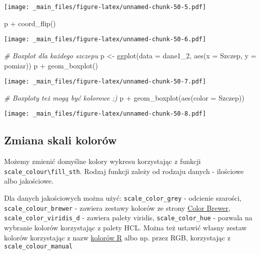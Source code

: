 \documentclass[
]{book}
\newenvironment{Shaded}{\begin{snugshade}}{\end{snugshade}}
\newcommand{\AttributeTok}[1]{\textcolor[rgb]{0.77,0.63,0.00}{#1}}
\newcommand{\CommentTok}[1]{\textcolor[rgb]{0.56,0.35,0.01}{\textit{#1}}}
\newcommand{\FunctionTok}[1]{\textcolor[rgb]{0.00,0.00,0.00}{#1}}
\newcommand{\NormalTok}[1]{#1}
\newcommand{\OtherTok}[1]{\textcolor[rgb]{0.56,0.35,0.01}{#1}}
\newcommand{\SpecialCharTok}[1]{\textcolor[rgb]{0.00,0.00,0.00}{#1}}
\begin{document}
\texttt{[image: \_main\_files/figure-latex/unnamed-chunk-50-5.pdf]}

\begin{Shaded}
\begin{Highlighting}[]
\NormalTok{p }\SpecialCharTok{+} \FunctionTok{coord\_flip}\NormalTok{()}
\end{Highlighting}
\end{Shaded}

\texttt{[image: \_main\_files/figure-latex/unnamed-chunk-50-6.pdf]}

\begin{Shaded}
\begin{Highlighting}[]
\CommentTok{\# Boxplot dla każdego szczepu}
\NormalTok{p }\OtherTok{\textless{}{-}} \FunctionTok{ggplot}\NormalTok{(}\AttributeTok{data =}\NormalTok{ dane1\_2, }\FunctionTok{aes}\NormalTok{(}\AttributeTok{x =}\NormalTok{ Szczep, }\AttributeTok{y =}\NormalTok{ pomiar))}
\NormalTok{p }\SpecialCharTok{+} \FunctionTok{geom\_boxplot}\NormalTok{()}
\end{Highlighting}
\end{Shaded}

\texttt{[image: \_main\_files/figure-latex/unnamed-chunk-50-7.pdf]}

\begin{Shaded}
\begin{Highlighting}[]
\CommentTok{\# Boxploty też mogą być kolorowe ;)}
\NormalTok{p }\SpecialCharTok{+} \FunctionTok{geom\_boxplot}\NormalTok{(}\FunctionTok{aes}\NormalTok{(}\AttributeTok{color =}\NormalTok{ Szczep))}
\end{Highlighting}
\end{Shaded}

\texttt{[image: \_main\_files/figure-latex/unnamed-chunk-50-8.pdf]}

\hypertarget{zmiana-skali-koloruxf3w}{%
\subsection{Zmiana skali kolorów}\label{zmiana-skali-koloruxf3w}}

Możemy zmienić domyślne kolory wykresu korzystając z funkcji \texttt{scale\_colour\textbackslash{}fill\_sth}. Rodzaj funkcji zależy od rodzaju danych - ilościowe albo jakościowe.

Dla danych jakościowych można użyć: \texttt{scale\_color\_grey} - odcienie szarości, \texttt{scale\_colour\_brewer} - zawiera zestawy kolorów ze strony \href{http://colorbrewer2.org/}{Color Brewer}, \texttt{scale\_color\_viridis\_d} - zawiera palety viridis, \texttt{scale\_color\_hue} - pozwala na wybranie kolorów korzystając z palety HCL. Można też ustawić własny zestaw kolorów korzystając z nazw \href{http://www.stat.columbia.edu/~tzheng/files/Rcolor.pdf}{kolorów R} albo np. przez RGB, korzystając z \texttt{scale\_colour\_manual}
\end{document}
